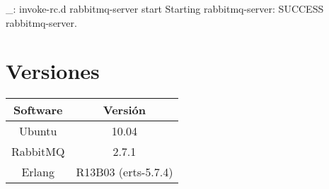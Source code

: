 \begin{bashcode}
_: invoke-rc.d rabbitmq-server start
Starting rabbitmq-server: SUCCESS
rabbitmq-server.
\end{bashcode}


\section{Versiones}

\begin{tabular}{|c|c|}
   \hline
   Software & Versión \\ \hline
   Ubuntu & 10.04 \\ \hline
   RabbitMQ & 2.7.1 \\ \hline
   Erlang & R13B03 (erts-5.7.4) \\ \hline
\end{tabular}
